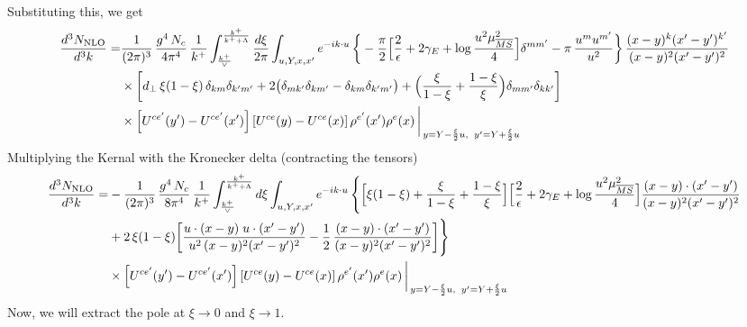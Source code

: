 \documentclass[9pt]{article}
\numberwithin{equation}{section}
\begin{document}
Substituting this, we get
\begin{align}
\frac{d^{3}N_{\rm NLO}}{d^{3}k}= &\frac{1}{(2\pi)^{3}}\,\frac{g^{4}\,N_{c}}{4\pi^{4}}\,\frac{1}{k^{+}}\int_{\frac{k^{+}}{\vee}}^{\frac{k^{+}}{k^{+}+\Lambda}}\frac{d\xi}{2\pi}\int_{u,Y,x,x'}e^{-ik\cdot u}\,
\bigg\{-\frac{\pi}{2}\Big[\frac{2}{\epsilon}+2\gamma_{E}+\log\frac{u^{2}\mu^{2}_{\overline{MS}}}{4}\Big]\delta^{mm'}-\pi\,\frac{u^{m}u^{m'}}{u^{2}}\bigg\}\,\frac{(x-y)^{k}(x'-y')^{k'}}{(x-y)^{2}(x'-y')^{2}}\notag\\
&\times\bigg[d_{\perp}\,\xi(1-\xi)\,\delta_{km}\delta_{k'm'}+2\big(\delta_{mk'}\delta_{km'}-\delta_{km}\delta_{k'm'}\big)+\Big(\frac{\xi}{1-\xi}+\frac{1-\xi}{\xi}\Big)\delta_{mm'}\delta_{kk'}\bigg]\notag\\
&\times\left[U^{ce'}(y') - U^{ce'}(x')\right]\left[U^{ce}(y) - U^{ce}(x)\right]\rho^{e'}(x')\rho^{e}(x)\,\bigg|_{\,y=Y-\frac{\xi}{2}u,\;\;y'=Y+\frac{\xi}{2}u}
\end{align}
Multiplying the Kernal with the Kronecker delta (contracting the tensors)
\begin{align}
\frac{d^{3}N_{\rm NLO}}{d^{3}k}= &-\frac{1}{(2\pi)^{3}}\,\frac{g^{4}\,N_{c}}{8\pi^{4}}\,\frac{1}{k^{+}}\int_{\frac{k^{+}}{\vee}}^{\frac{k^{+}}{k^{+}+\Lambda}}d\xi\int_{u,Y,x,x'}e^{-ik\cdot u}\,
\Bigg\{\Big[\xi(1-\xi)+\frac{\xi}{1-\xi}+\frac{1-\xi}{\xi}\Big]\Big[\frac{2}{\epsilon}+2\gamma_{E}+\log\frac{u^{2}\mu^{2}_{\overline{MS}}}{4}\Big]\frac{(x-y)\cdot(x'-y')}{(x-y)^{2}(x'-y')^{2}}\notag\\
&+2\,\xi(1-\xi)\bigg[\frac{u\cdot(x-y)\;u\cdot(x'-y')}{u^{2}\,(x-y)^{2}(x'-y')^{2}}-\frac{1}{2}\,\frac{(x-y)\cdot(x'-y')}{(x-y)^{2}(x'-y')^{2}}\bigg]\Bigg\}\notag\\
&\times\left[U^{ce'}(y') - U^{ce'}(x')\right]\left[U^{ce}(y) - U^{ce}(x)\right]\rho^{e'}(x')\rho^{e}(x)\,\bigg|_{\,y=Y-\frac{\xi}{2}u,\;\;y'=Y+\frac{\xi}{2}u}
\end{align}
Now, we will extract the pole at $\xi\to 0$ and $\xi \to 1$. 
\end{document}
